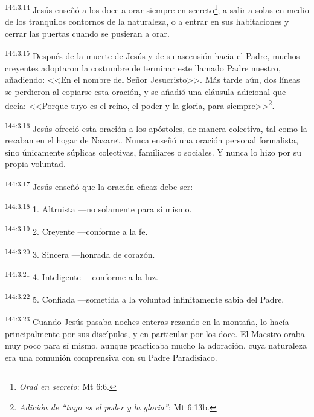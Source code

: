 \par 
\textsuperscript{144:3.14} Jesús enseñó a los doce a orar siempre en secreto\footnote{\textit{Orad en secreto}: Mt 6:6.}; a salir a solas en medio de los tranquilos contornos de la naturaleza, o a entrar en sus habitaciones y cerrar las puertas cuando se pusieran a orar.

\par 
\textsuperscript{144:3.15} Después de la muerte de Jesús y de su ascensión hacia el Padre, muchos creyentes adoptaron la costumbre de terminar este llamado Padre nuestro, añadiendo: <<En el nombre del Señor Jesucristo>>. Más tarde aún, dos líneas se perdieron al copiarse esta oración, y se añadió una cláusula adicional que decía: <<Porque tuyo es el reino, el poder y la gloria, para siempre>>\footnote{\textit{Adición de ``tuyo es el poder y la gloria''}: Mt 6:13b.}.

\par 
\textsuperscript{144:3.16} Jesús ofreció esta oración a los apóstoles, de manera colectiva, tal como la rezaban en el hogar de Nazaret. Nunca enseñó una oración personal formalista, sino únicamente súplicas colectivas, familiares o sociales. Y nunca lo hizo por su propia voluntad.

\par 
\textsuperscript{144:3.17} Jesús enseñó que la oración eficaz debe ser:

\par 
\textsuperscript{144:3.18} 1. Altruista ---no solamente para sí mismo.

\par 
\textsuperscript{144:3.19} 2. Creyente ---conforme a la fe.

\par 
\textsuperscript{144:3.20} 3. Sincera ---honrada de corazón.

\par 
\textsuperscript{144:3.21} 4. Inteligente ---conforme a la luz.

\par 
\textsuperscript{144:3.22} 5. Confiada ---sometida a la voluntad infinitamente sabia del Padre.

\par 
\textsuperscript{144:3.23} Cuando Jesús pasaba noches enteras rezando en la montaña, lo hacía principalmente por sus discípulos, y en particular por los doce. El Maestro oraba muy poco para sí mismo, aunque practicaba mucho la adoración, cuya naturaleza era una comunión comprensiva con su Padre Paradisiaco.

